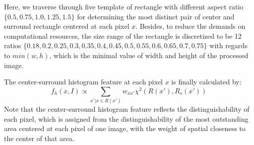 \documentclass[10pt,twocolumn,letterpaper]{article}
\newcommand{\SUM}{\sum\limits}
\begin{document}
    Here, we traverse through five template of rectangle with different aspect ratio 
    $\{ 0.5, 0.75, 1.0, 1.25, 1.5\}$ for determining the most distinct pair of center 
    and surround rectangle centered at each pixel $x$. Besides, to reduce the demands 
    on computational resources, the size range of the rectangle is discretized to be 
    12 ratios $\{ {0.18, 0.2, 0.25, 0.3, 0.35, 0.4, 0.45, 0.5, 0.55, 0.6, 0.65, 0.7, 0.75}\}$
    with regards to  $min(w,h)$, which is the minimal value of width and height of 
    the processed image.

    The center-surround histogram feature at each pixel $x$ is finally calculated by:
    $$
    f_h(x,I)\propto\SUM_{x'|x\in R(x')}w_{xx'}\chi^2(R(x'),R_s(x'))
    $$
    Note that the center-surround histogram feature reflects the distinguishability of 
    each pixel, which is assigned from the distinguishability of the most outstanding 
    area centered at each pixel of one image, with the weight of spatial closeness
    to the center of that area. 
\end{document}
